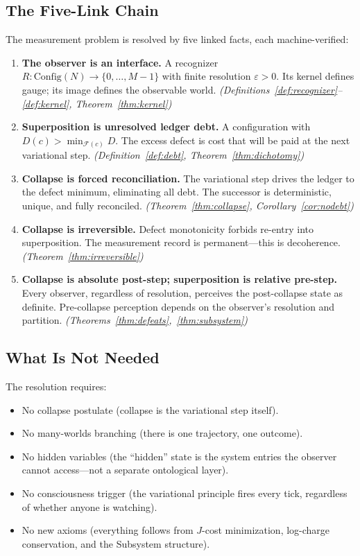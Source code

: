 \documentclass[11pt,a4paper]{article}
\theoremstyle{plain}
\theoremstyle{definition}
\theoremstyle{remark}
\newcommand{\Jcost}{J}
\newcommand{\F}{\mathcal{F}}
\begin{document}
\subsection{The Five-Link Chain}

The measurement problem is resolved by five linked facts, each machine-verified:

\begin{enumerate}[nosep]
\item \textbf{The observer is an interface.}
A recognizer $R : \mathrm{Config}(N) \to \{0,\ldots,M{-}1\}$ with finite resolution $\varepsilon > 0$.
Its kernel defines gauge; its image defines the observable world.
\emph{(Definitions~\ref{def:recognizer}--\ref{def:kernel}, Theorem~\ref{thm:kernel})}

\item \textbf{Superposition is unresolved ledger debt.}
A configuration with $D(c) > \min_{\F(c)} D$.
The excess defect is cost that will be paid at the next variational step.
\emph{(Definition~\ref{def:debt}, Theorem~\ref{thm:dichotomy})}

\item \textbf{Collapse is forced reconciliation.}
The variational step drives the ledger to the defect minimum, eliminating all debt.
The successor is deterministic, unique, and fully reconciled.
\emph{(Theorem~\ref{thm:collapse}, Corollary~\ref{cor:nodebt})}

\item \textbf{Collapse is irreversible.}
Defect monotonicity forbids re-entry into superposition.
The measurement record is permanent---this is decoherence.
\emph{(Theorem~\ref{thm:irreversible})}

\item \textbf{Collapse is absolute post-step; superposition is relative pre-step.}
Every observer, regardless of resolution, perceives the post-collapse state as definite.
Pre-collapse perception depends on the observer's resolution and partition.
\emph{(Theorems~\ref{thm:defeats},~\ref{thm:subsystem})}
\end{enumerate}

\subsection{What Is Not Needed}

The resolution requires:
\begin{itemize}[nosep]
\item No collapse postulate (collapse is the variational step itself).
\item No many-worlds branching (there is one trajectory, one outcome).
\item No hidden variables (the ``hidden'' state is the system entries the observer cannot access---not a separate ontological layer).
\item No consciousness trigger (the variational principle fires every tick, regardless of whether anyone is watching).
\item No new axioms (everything follows from $\Jcost$-cost minimization, log-charge conservation, and the Subsystem structure).
\end{itemize}
\end{document}
